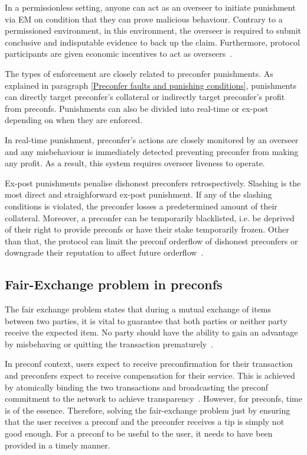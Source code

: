 \documentclass[conference]{IEEEtran}
\theoremstyle{boldstyle}
\begin{document}
    In a permissionless setting, anyone can act as an overseer to initiate punishment via EM on condition that they can prove malicious behaviour. Contrary to a permissioned environment, in this environment, the overseer is required to submit conclusive and indisputable evidence to back up the claim. Furthermore, protocol participants are given economic incentives to act as overseers~\cite{W:GitHub-UniversalRegistryContract,W:GitHub-ExampleSlasherImplementations,W:PreconfirmationFairExchange}. 

    The types of enforcement are closely related to preconfer punishments. As explained in paragraph \ref{Preconfer faults and punishing conditions}, punishments can directly target preconfer's collateral or indirectly target preconfer's profit from preconfs. Punishments can also be divided into real-time or ex-post depending on when they are enforced.
    
    In real-time punishment, preconfer's actions are closely monitored by an overseer and any misbehaviour is immediately detected preventing preconfer from making any profit. As a result, this system requires overseer liveness to operate. 
    
    Ex-post punishments penalise dishonest preconfers retrospectively. Slashing is the most direct and straighforward ex-post punishment. If any of the slashing conditions is violated, the preconfer losses a predetermined amount of their collateral. Moreover, a preconfer can be temporarily blacklisted, i.e. be deprived of their right to provide preconfs or have their stake temporarily frozen. Other than that, the protocol can limit the preconf orderflow of dishonest preconfers or downgrade their reputation to affect future orderflow~\cite{W:PreconfirmationFairExchange,W:User-DefinedPenalties:EnsuringHonestPreconfBehavior}.

    
    \subsection{Fair-Exchange problem in preconfs}
    The fair exchange problem states that during a mutual exchange of items between two parties, it is vital to guarantee that both parties or neither party receive the expected item. No party should have the ability to gain an advantage by misbehaving or quitting the transaction prematurely~\cite{P:Fairexchangewithasemi-trustedthirdparty}.

    In preconf context, users expect to receive preconfirmation for their transaction and preconfers expect to receive compensation for their service. This is achieved by atomically binding the two transactions and broadcasting the preconf commitment to the network to achieve transparency~\cite{W:ThePreconfirmationGatewayUnlockingPreconfirmations:FromUsertoPreconfer}.
    However, for preconfs, time is of the essence. Therefore, solving the fair-exchange problem just by ensuring that the user receives a preconf and the preconfer receives a tip is simply not good enough. For a preconf to be useful to the user, it needs to have been provided in a timely manner.
\end{document}
